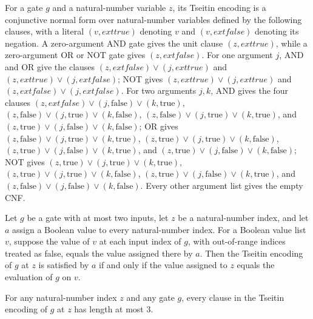 \begin{definition}
\label{BoolCircuit.DAGGate.tseitin}
\leanok
{}
For a gate $g$ and a natural-number variable $z$, its Tseitin encoding is a conjunctive
normal form over natural-number variables defined by the following clauses, with a
literal $(v,	ext{true})$ denoting $v$ and $(v,	ext{false})$ denoting its negation. A
zero-argument AND gate gives the unit clause $(z,	ext{true})$, while a zero-argument OR
or NOT gate gives $(z,	ext{false})$. For one argument $j$, AND and OR give the clauses
$(z,	ext{false})\vee(j,	ext{true})$ and $(z,	ext{true})\vee(j,	ext{false})$; NOT gives
$(z,	ext{true})\vee(j,	ext{true})$ and $(z,	ext{false})\vee(j,	ext{false})$. For two
arguments $j,k$, AND gives the four clauses
$(z,	ext{false})\vee(j,\text{false})\vee(k,\text{true})$,
$(z,\text{false})\vee(j,\text{true})\vee(k,\text{false})$,
$(z,\text{false})\vee(j,\text{true})\vee(k,\text{true})$, and
$(z,\text{true})\vee(j,\text{false})\vee(k,\text{false})$; OR gives
$(z,\text{false})\vee(j,\text{true})\vee(k,\text{true})$,
$(z,\text{true})\vee(j,\text{true})\vee(k,\text{false})$,
$(z,\text{true})\vee(j,\text{false})\vee(k,\text{true})$, and
$(z,\text{true})\vee(j,\text{false})\vee(k,\text{false})$; NOT gives
$(z,\text{true})\vee(j,\text{true})\vee(k,\text{true})$,
$(z,\text{true})\vee(j,\text{true})\vee(k,\text{false})$,
$(z,\text{true})\vee(j,\text{false})\vee(k,\text{true})$, and
$(z,\text{false})\vee(j,\text{false})\vee(k,\text{false})$. Every other argument list
gives the empty CNF.
\end{definition}

\begin{theorem}
\label{BoolCircuit.DAGGate.eval_tseitin}
\leanok
{}
Let $g$ be a gate with at most two inputs, let $z$ be a natural-number index, and let
$a$ assign a Boolean value to every natural-number index. For a Boolean value list $v$,
suppose the value of $v$ at each input index of $g$, with out-of-range indices treated
as false, equals the value assigned there by $a$. Then the Tseitin encoding of $g$ at
$z$ is satisfied by $a$ if and only if the value assigned to $z$ equals the evaluation
of $g$ on $v$.
\end{theorem}

\begin{theorem}
\label{BoolCircuit.DAGGate.length_le_of_mem_tseitin}
\leanok
{}
For any natural-number index $z$ and any gate $g$, every clause in the Tseitin encoding
of $g$ at $z$ has length at most $3$.
\end{theorem}

